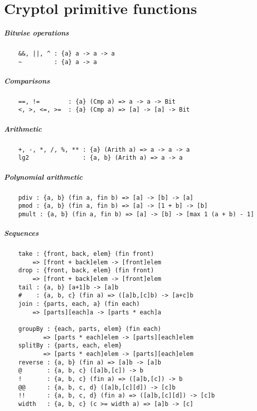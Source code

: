 \chapter{Cryptol primitive functions}


\paragraph*{Bitwise operations}
\begin{Verbatim}
    &&, ||, ^ : {a} a -> a -> a
    ~         : {a} a -> a
\end{Verbatim}
\paragraph*{Comparisons}
\begin{Verbatim}
    ==, !=        : {a} (Cmp a) => a -> a -> Bit
    <, >, <=, >=  : {a} (Cmp a) => [a] -> [a] -> Bit
\end{Verbatim}
\paragraph*{Arithmetic}
\begin{Verbatim}
    +, -, *, /, %, ** : {a} (Arith a) => a -> a -> a
    lg2               : {a, b} (Arith a) => a -> a
\end{Verbatim}
\paragraph*{Polynomial arithmetic}
\begin{Verbatim}
    pdiv : {a, b} (fin a, fin b) => [a] -> [b] -> [a]
    pmod : {a, b} (fin a, fin b) => [a] -> [1 + b] -> [b]
    pmult : {a, b} (fin a, fin b) => [a] -> [b] -> [max 1 (a + b) - 1]
\end{Verbatim}
\paragraph*{Sequences}
\begin{Verbatim}
    take : {front, back, elem} (fin front) 
        => [front + back]elem -> [front]elem
    drop : {front, back, elem} (fin front) 
        => [front + back]elem -> [front]elem
    tail : {a, b} [a+1]b -> [a]b
    #    : {a, b, c} (fin a) => ([a]b,[c]b) -> [a+c]b
    join : {parts, each, a} (fin each) 
        => [parts][each]a -> [parts * each]a

    groupBy : {each, parts, elem} (fin each) 
           => [parts * each]elem -> [parts][each]elem
    splitBy : {parts, each, elem} 
           => [parts * each]elem -> [parts][each]elem
    reverse : {a, b} (fin a) => [a]b -> [a]b
    @       : {a, b, c} ([a]b,[c]) -> b
    !       : {a, b, c} (fin a) => ([a]b,[c]) -> b
    @@      : {a, b, c, d} ([a]b,[c][d]) -> [c]b
    !!      : {a, b, c, d} (fin a) => ([a]b,[c][d]) -> [c]b
    width   : {a, b, c} (c >= width a) => [a]b -> [c]
\end{Verbatim}
